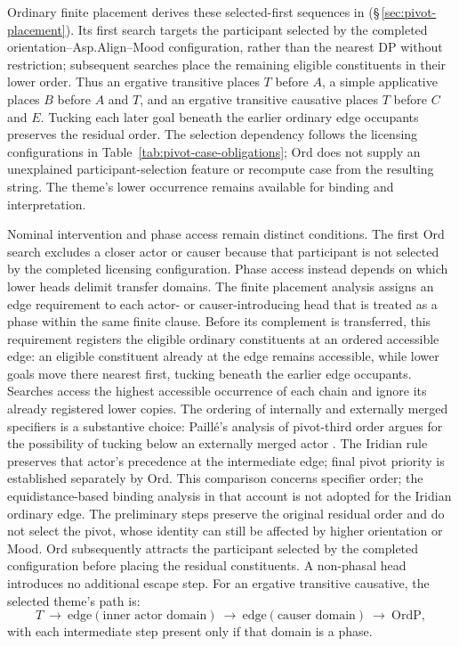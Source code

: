 Ordinary finite placement derives these selected-first sequences in
  (§\,\ref{sec:pivot-placement}). Its first search targets the
 participant selected by the completed orientation--Asp.Align--Mood
 configuration, rather than the nearest DP without restriction; subsequent
 searches place the remaining eligible constituents in their lower order.
 Thus an ergative transitive places $T$ before $A$, a simple applicative
 places $B$ before $A$ and $T$, and an ergative transitive causative places
 $T$ before $C$ and $E$. Tucking each later goal beneath the earlier ordinary
 edge occupants preserves the residual order. The selection dependency
 follows the licensing configurations in
 Table~\ref{tab:pivot-case-obligations}; Ord does not supply an unexplained
 participant-selection feature or recompute case from the resulting string.
 The theme's lower occurrence remains available for binding and interpretation.

Nominal intervention and phase access remain distinct conditions. The first
 Ord search excludes a closer actor or causer because that participant is not
 selected by the completed licensing configuration. Phase access instead
 depends on which lower heads delimit transfer domains. The finite placement
 analysis assigns an edge requirement to each actor- or causer-introducing
 head that is treated as a phase within the same finite clause. Before its
 complement is transferred, this requirement registers the eligible ordinary
 constituents at an ordered accessible edge: an eligible constituent already
 at the edge remains accessible, while lower goals move there nearest first,
 tucking beneath the earlier edge occupants. Searches access the highest
 accessible occurrence of each chain and ignore its already registered lower
 copies. The ordering of internally and externally merged specifiers is a
 substantive choice: Paillé's analysis of pivot-third order argues for the
 possibility of tucking below an externally merged actor
 \cite[§5.1]{paille2021}. The Iridian rule preserves that actor's
 precedence at the intermediate edge; final pivot priority is established
 separately by Ord. This comparison concerns specifier order; the
 equidistance-based binding analysis in that account is not adopted for the
 Iridian ordinary edge. The preliminary steps preserve the original residual
 order and do not select the pivot, whose identity can
 still be affected by higher orientation or Mood. Ord subsequently attracts
 the participant selected by the completed configuration before placing the
 residual constituents. A non-phasal head introduces no additional escape
 step. For an ergative transitive causative, the selected theme's path is:
\[
 T\ \longrightarrow\ \mathrm{edge}(\text{inner actor domain})
 \ \longrightarrow\ \mathrm{edge}(\text{causer domain})
 \ \longrightarrow\ \mathrm{OrdP},
\]
with each intermediate step present only if that domain is a phase.

